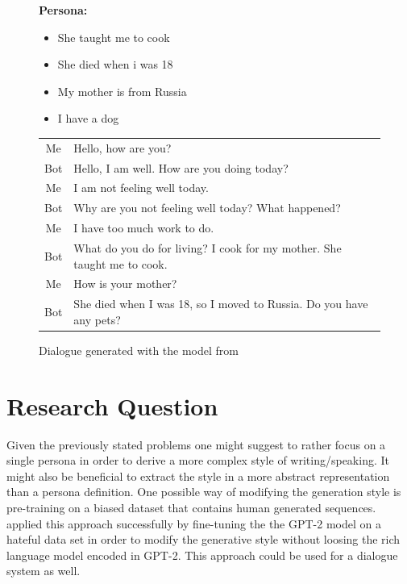 \documentclass[11pt]{article}
\begin{document}
\begin{figure}[h]
\label{dialogue}
\textbf{Persona:}
\begin{itemize}
\item She taught me to cook
\item She died when i was 18
\item My mother is from Russia
\item I have a dog
\end{itemize}
\begin{tabular}{c | l}
Me & Hello, how are you?\\
Bot & Hello, I am well. How are you doing today?\\
Me & I am not feeling well today.\\
Bot & Why are you not feeling well today? What happened?\\
Me & I have too much work to do.\\
Bot & What do you do for living? I cook for my mother. She taught me to cook.\\
Me & How is your mother?\\
Bot & She died when I was 18, so I moved to Russia. Do you have any pets?
\end{tabular}
\caption[]{Dialogue generated with the model from \cite[]{liu2020impress}}
\end{figure}

\section{Research Question}
Given the previously stated problems one might suggest to rather focus on a single persona in order to derive a more complex style of writing/speaking. It might also be beneficial to extract the style in a more abstract representation than a persona definition. One possible way of modifying the generation style is pre-training on a biased dataset that contains human generated sequences. \cite[]{wullach2020hate} applied this approach successfully by fine-tuning the the GPT-2 model \cite[]{Radford2019LanguageMA} on a hateful data set in order to modify the generative style without loosing the rich language model encoded in GPT-2. This approach could be used for a dialogue system as well. 
\end{document}
